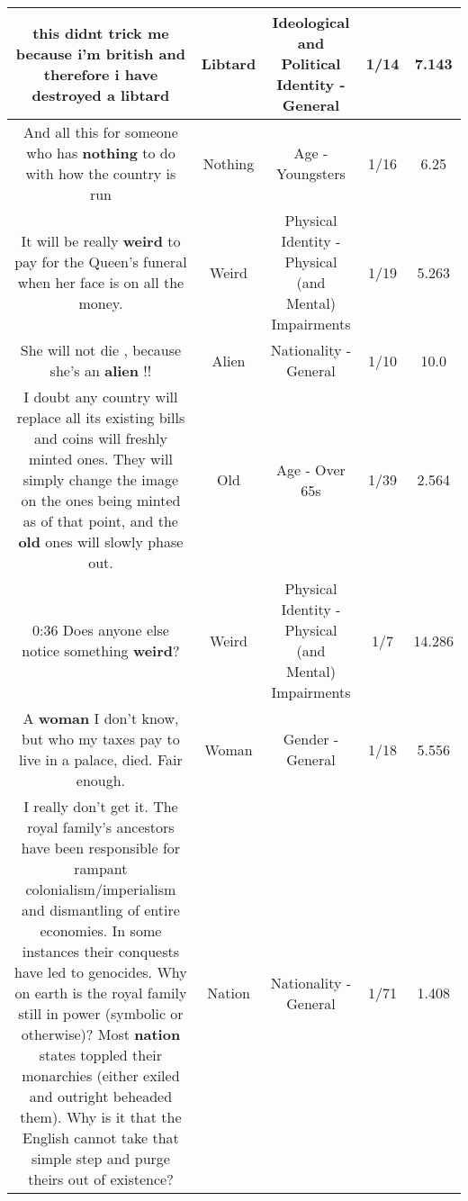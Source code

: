 \documentclass[11pt]{article}
\newlength\mylength
\begin{document}
\begin{center}
\begin{longtable}{|C{.65\mylength}|C{.30\mylength}|C{.12\mylength}|C{.12\mylength}|C{.12\mylength}|}
  \small this didnt trick me because i'm british and therefore i have destroyed a libtard\normalsize   & Libtard &  Ideological and Political Identity - General & 1/14 & 7.143 \\  \hline
  \small And all this for someone who has \textbf{nothing} to do with how the country is run\normalsize   & Nothing & Age - Youngsters & 1/16 & 6.25 \\  \hline
  \small It will be really \textbf{weird} to pay for the Queen's funeral when her face is on all the money.\normalsize   & Weird & Physical Identity - Physical (and Mental) Impairments & 1/19 & 5.263 \\  \hline
  \small She will not die , because she's an \textbf{alien} !!\normalsize   & Alien & Nationality - General & 1/10 & 10.0 \\  \hline
  \small I doubt any country will replace all its existing bills and coins will freshly minted ones. They will simply change the image on the ones being minted as of that point, and the \textbf{old} ones will slowly phase out.\normalsize   & Old & Age - Over 65s & 1/39 & 2.564 \\  \hline
  \small 0:36 Does anyone else notice something \textbf{weird}?\normalsize   & Weird & Physical Identity - Physical (and Mental) Impairments & 1/7 & 14.286 \\  \hline
  \small A \textbf{woman} I don't know, but who my taxes pay to live in a palace, died. Fair enough.\normalsize   & Woman & Gender - General & 1/18 & 5.556 \\  \hline
  \small I really don't get it. The royal family's ancestors have been responsible for rampant colonialism/imperialism and dismantling of entire economies. In some instances their conquests have led to genocides. Why on earth is the royal family still in power (symbolic or otherwise)?  Most \textbf{nation} states toppled their monarchies (either exiled and outright beheaded them). Why is it that the English cannot take that simple step and purge theirs out of existence?\normalsize   & Nation & Nationality - General & 1/71 & 1.408 \\  \hline

\end{longtable}
\end{center}
\end{document}
